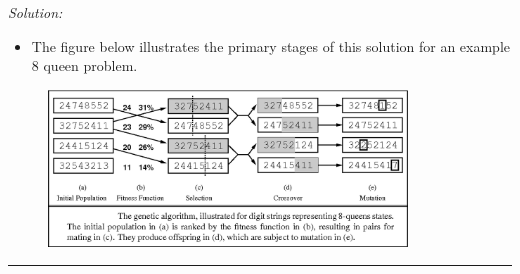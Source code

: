 \documentclass[a4paper, 11pt]{article}
\newenvironment{solution}
    {\textit{Solution:}}
    {}
\begin{document}
{\begin{solution}
	\begin{itemize}
		\item The figure below illustrates the primary stages of this solution for an example 8 queen problem.
	\end{itemize}
	\begin{figure}[h!]
		\centering
		\includegraphics[width=0.85\textwidth]{0E4BagM.png}
	\end{figure}
\end{solution}
\noindent\rule{7in}{2.8pt}
\pagebreak
\end{document}
